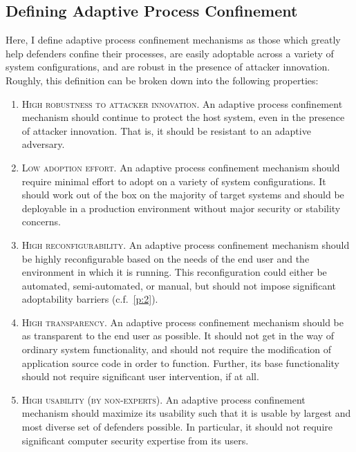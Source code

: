 \documentclass[dvipsnames, 12pt]{article}
\begin{document}
\subsection{Defining Adaptive Process Confinement}

Here, I define adaptive process confinement mechanisms as those which greatly
help defenders confine their processes, are easily adoptable across a variety of
system configurations, and are robust in the presence of attacker innovation.
Roughly, this definition can be broken down into the following properties:
\begin{enumerate}[label=\bfseries P\arabic*., ref=P\arabic*, labelindent=2em]
    \item \label{p:1} \textsc{High robustness to attacker innovation.} An adaptive
    process confinement mechanism should continue to protect the host system,
    even in the presence of attacker innovation. That is, it should be resistant
    to an adaptive adversary.

    \item \label{p:2} \textsc{Low adoption effort.} An adaptive process
    confinement mechanism should require minimal effort to adopt on a variety of
    system configurations. It should work out of the box on the majority of
    target systems and should be deployable in a production environment without
    major security or stability concerns.

    \item \label{p:3} \textsc{High reconfigurability.} An adaptive process
    confinement mechanism should be highly reconfigurable based on the needs of
    the end user and the environment in which it is running. This
    reconfiguration could either be automated, semi-automated, or manual, but
    should not impose significant adoptability barriers (c.f.~\ref{p:2}).

    \item \label{p:4} \textsc{High transparency.} An adaptive process
    confinement mechanism should be as transparent to the end user as possible.
    It should not get in the way of ordinary system functionality, and should
    not require the modification of application source code in order to
    function. Further, its base functionality should not require significant
    user intervention, if at all.

    \item \label{p:5} \textsc{High usability (by non-experts).} An adaptive process confinement
    mechanism should maximize its usability such that it is usable by largest
    and most diverse set of defenders possible. In particular, it should not
    require significant computer security expertise from its users.
\end{enumerate}
\end{document}
